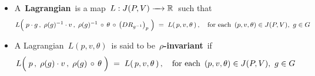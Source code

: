 \begin{definition}
\begin{itemize}
\begin{equation*}
\begin{array}{c}
{{                    is a linear map 
                    }}
                \end{array}
                \right.
            \!\right\}
    \end{equation*}
\item
    A \,\textbf{Lagrangian}\, is a map
    \,$L : J(P,V) \xrightarrow{{\color{white}....}} \Re$\,
    such that
    \begin{equation*}
    L\!\left(\;
        \overset{{\color{white}1}}{p \cdot g}
        \,,\;
        \rho(g)^{-1}\cdot v
        \,,\;
        \rho(g)^{-1} \,\circ\, \theta \,\circ\, \left(DR_{g^{-1}}\right)_{p}
        \;\right)
    \; = \;
        L\!\left(\,p,v,\theta\,\right),
    \quad
    \textnormal{for each \,$(p,v,\theta) \in J(P,V)$,\, $g \in G$}
    \end{equation*}
\item
    A Lagrangian \,$L(p,v,\theta)$\, is said to be \,\textbf{$\rho$-invariant}\, if
    \begin{equation*}
    L\!\left(\;
        \overset{{\color{white}1}}{p}
        \,,\;
        \rho(g)\cdot v
        \,,\;
        \rho(g) \,\circ\, \theta
        \;\right)
    \; = \;
        L\!\left(\,p,v,\theta\,\right),
    \quad
    \textnormal{for each \,$(p,v,\theta) \in J(P,V)$,\, $g \in G$}
    \end{equation*}
\end{itemize}
\end{definition}



